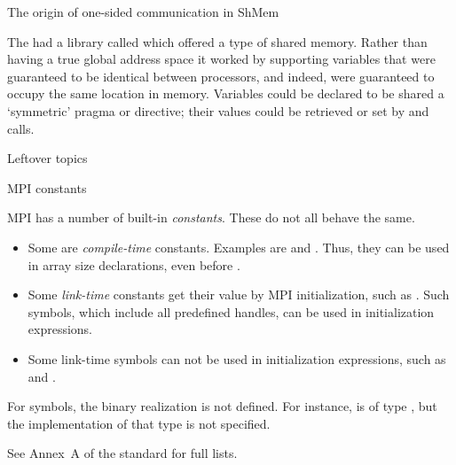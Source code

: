  {The origin of one-sided communication in ShMem}

The  had a library called 
which offered a type of shared memory. Rather than having a true
global address space it worked by supporting variables that were
guaranteed to be identical between processors, and indeed, were
guaranteed to occupy the same location in memory. Variables could be
declared to be shared a `symmetric' pragma or directive; their values
could be retrieved or set by  and  calls.

 {Leftover topics}

 {MPI constants}

MPI has a number of built-in \emph{constants}. These do not all behave
the same.
\begin{itemize}
\item Some are \emph{compile-time}
  constants. Examples are  and
  . Thus, they can be used in
  array size declarations, even before .
\item Some \emph{link-time}
  constants get their value by MPI initialization, such as
  . Such symbols, which include all
  predefined handles, can be used in initialization expressions.
\item Some link-time symbols can not be used in initialization
  expressions, such as  and .
\end{itemize}

For symbols, the binary realization is not defined. For instance,
 is of type , but
the implementation of that type is not specified.

See Annex~A of the  standard for full lists.

